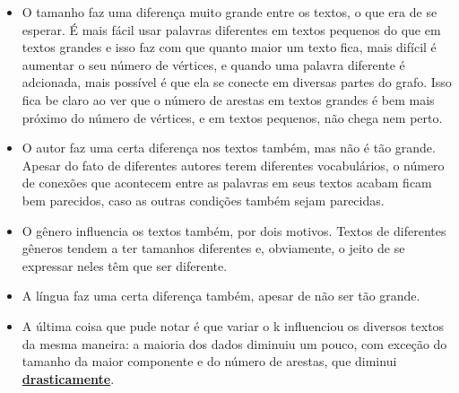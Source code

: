 \documentclass[12pt]{article}
\newcommand{\mytitle}[1]{\textbf{\underline{#1}}}
\begin{document}
\begin{itemize}
  
\item O tamanho faz uma diferença muito grande entre os textos, o que era de se esperar. É mais fácil usar palavras diferentes em textos pequenos do que em textos grandes e isso faz com que quanto maior um texto fica, mais difícil é aumentar o seu número de vértices, e quando uma palavra diferente é adcionada, mais possível é que ela se conecte em diversas partes do grafo. Isso fica be claro ao ver que o número de arestas em textos grandes é bem mais próximo do número de vértices, e em textos pequenos, não chega nem perto.
  
\item O autor faz uma certa diferença nos textos também, mas não é tão grande. Apesar do fato de diferentes autores terem diferentes vocabulários, o número de conexões que acontecem entre as palavras em seus textos acabam ficam bem parecidos, caso as outras condições também sejam parecidas.
  
\item O gênero influencia os textos também, por dois motivos. Textos de diferentes gêneros tendem a ter tamanhos diferentes e, obviamente, o jeito de se expressar neles têm que ser diferente.
  
\item A língua faz uma certa diferença também, apesar de não ser tão grande.
  
\item A última coisa que pude notar é que variar o k influenciou os diversos textos da mesma maneira: a maioria dos dados diminuiu um pouco, com exceção do tamanho da maior componente e do número de arestas, que diminui \mytitle{drasticamente}.
  
\end{itemize}
\end{document}
